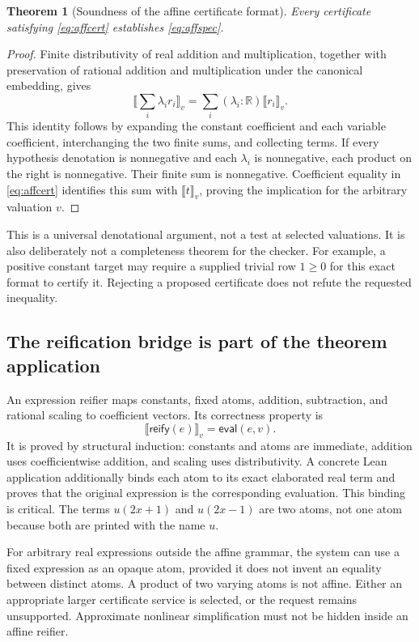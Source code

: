 \documentclass[11pt,a4paper]{article}
\newtheorem{theorem}{Theorem}[section]
\theoremstyle{definition}
\theoremstyle{remark}
\newcommand{\R}{\mathbb R}
\newcommand{\den}[1]{\llbracket #1\rrbracket}
\begin{document}
\begin{theorem}[Soundness of the affine certificate format]
\label{thm:affine}
Every certificate satisfying \eqref{eq:affcert} establishes \eqref{eq:affspec}.
\end{theorem}
\begin{proof}
Finite distributivity of real addition and multiplication, together with preservation of rational addition and multiplication under the canonical embedding, gives
\[
 \den{\sum_i\lambda_i r_i}_v
 =\sum_i (\lambda_i:\R)\den{r_i}_v.
\]
This identity follows by expanding the constant coefficient and each variable coefficient, interchanging the two finite sums, and collecting terms. If every hypothesis denotation is nonnegative and each $\lambda_i$ is nonnegative, each product on the right is nonnegative. Their finite sum is nonnegative. Coefficient equality in \eqref{eq:affcert} identifies this sum with $\den t_v$, proving the implication for the arbitrary valuation $v$.
\end{proof}

This is a universal denotational argument, not a test at selected valuations. It is also deliberately not a completeness theorem for the checker. For example, a positive constant target may require a supplied trivial row $1\ge0$ for this exact format to certify it. Rejecting a proposed certificate does not refute the requested inequality.

\subsection{The reification bridge is part of the theorem application}
An expression reifier maps constants, fixed atoms, addition, subtraction, and rational scaling to coefficient vectors. Its correctness property is
\[
 \den{\mathsf{reify}(e)}_v=\mathsf{eval}(e,v).
\]
It is proved by structural induction: constants and atoms are immediate, addition uses coefficientwise addition, and scaling uses distributivity. A concrete Lean application additionally binds each atom to its exact elaborated real term and proves that the original expression is the corresponding evaluation. This binding is critical. The terms $u(2x+1)$ and $u(2x-1)$ are two atoms, not one atom because both are printed with the name $u$.

For arbitrary real expressions outside the affine grammar, the system can use a fixed expression as an opaque atom, provided it does not invent an equality between distinct atoms. A product of two varying atoms is not affine. Either an appropriate larger certificate service is selected, or the request remains unsupported. Approximate nonlinear simplification must not be hidden inside an affine reifier.
\end{document}
